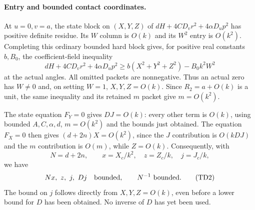 \paragraph{Entry and bounded contact coordinates.}
At $u=0,v=a$, the state block on $(X,Y,Z)$ of
$dH+4CD_vr^2+4\alpha D_up^2$ has positive definite residue.
Its $W$ column is $O(k)$ and its $W^2$ entry is $O(k^2)$.
Completing this ordinary bounded hard block gives, for positive
real constants $b,B_0$, the coefficient-field inequality
\[
 dH+4CD_vr^2+4\alpha D_up^2
 \geq b(X^2+Y^2+Z^2)-B_0 k^2W^2
\]
at the actual angles. All omitted packets are nonnegative.
Thus an actual zero has $W\ne0$ and, on setting $W=1$,
$X,Y,Z=O(k)$. Since $R_2=a+O(k)$ is a unit, the same inequality
and its retained $m$ packet give $m=O(k^2)$.

The state equation $F_Y=0$ gives $DJ=O(k)$: every other term is
$O(k)$, using bounded $A,C,\alpha,d$, $m=O(k^2)$ and the bounds
just obtained. The equation $F_X=0$ then gives
$(d+2n)X=O(k^2)$, since the $J$ contribution is $O(kDJ)$ and the
$m$ contribution is $O(m)$, while $Z=O(k)$. Consequently, with
\[
 N=d+2n,\qquad x=X_c/k^2,\quad z=Z_c/k,\quad j=J_c/k,
\]
we have
\[
 Nx,\ z,\ j,\ Dj\quad\hbox{bounded},\qquad N^{-1}\ \hbox{bounded}.
                                                               \tag{TD2}
\]
The bound on $j$ follows directly from $X,Y,Z=O(k)$, even before a
lower bound for $D$ has been obtained. No inverse of $D$ has yet
been used.


